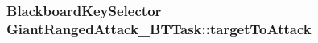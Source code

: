 \subsubsection[{\texorpdfstring{target\+To\+Attack}{targetToAttack}}]{\setlength{\rightskip}{0pt plus 5cm}Blackboard\+Key\+Selector Giant\+Ranged\+Attack\+\_\+\+B\+T\+Task\+::target\+To\+Attack}\hypertarget{class_giant_ranged_attack___b_t_task_ad33350d20d5e08acc84fd65329562c63}{}\label{class_giant_ranged_attack___b_t_task_ad33350d20d5e08acc84fd65329562c63}
